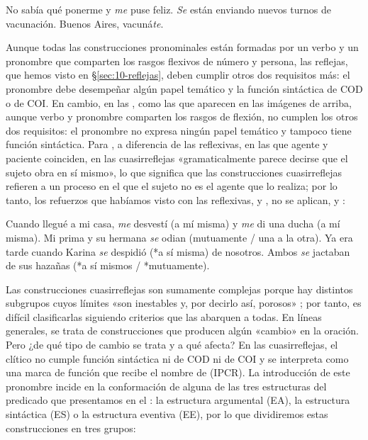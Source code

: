 
\begin{exe}
  \ex\label{ex:10-feliz} No sabía qué ponerme y \textit{me} puse feliz.
  \ex\label{ex:10-turnos} \textit{Se} están enviando nuevos turnos de vacunación.
  \ex\label{ex:10-vacunate} Buenos Aires, vacuná\textit{te}.
\end{exe}

Aunque todas las construcciones pronominales están formadas por un verbo y un
pronombre que comparten los rasgos flexivos de número y persona, las reflejas,
que hemos visto en §\ref{sec:10-reflejas}, deben cumplir otros dos requisitos
más: el pronombre debe desempeñar algún papel temático y la función sintáctica
de COD o de COI. En cambio, en las , como las que
aparecen en las imágenes de arriba, aunque verbo y pronombre comparten los rasgos
de flexión, no cumplen los otros dos requisitos: el pronombre no expresa ningún
papel temático y tampoco tiene función sintáctica. Para
\textcite[§\,759]{bello2002}, a diferencia de las reflexivas, en las que agente y
paciente coinciden, en las cuasirreflejas «gramaticalmente parece decirse que el
sujeto obra en sí mismo», lo que significa que las construcciones cuasirreflejas
refieren a un proceso en el que el sujeto no es el agente que lo realiza; por lo
tanto, los refuerzos que habíamos visto con las reflexivas,
 y , no se aplican,
 y :

\begin{exe}
  \ex\label{ex:10-desvesti} Cuando llegué a mi casa, \textit{me} desvestí (a mí
      misma) y \textit{me} di una ducha (a mí misma).
  \ex\label{ex:10-odian} Mi prima y su hermana \textit{se} odian (mutuamente /
      una a la otra).
  \ex\label{ex:10-despidio} Ya era tarde cuando Karina \textit{se} despidió (*a
      sí misma) de nosotros.
  \ex\label{ex:10-jactaban} Ambos \textit{se} jactaban de sus hazañas (*a sí
      mismos / *mutuamente).
\end{exe}

Las construcciones cuasirreflejas son sumamente complejas porque hay distintos
subgrupos cuyos límites «son inestables y, por decirlo así, porosos»
\parencite[17]{sanchezlopez2002}; por tanto, es difícil clasificarlas siguiendo
criterios que las abarquen a todas. En líneas generales, se trata de
construcciones que producen algún «cambio» en la oración. Pero ¿de qué tipo de
cambio se trata y a qué afecta? En las cuasirreflejas, el clítico no cumple
función sintáctica ni de COD ni de COI y se interpreta como una marca de función
que recibe el nombre de  (IPCR). La
introducción de este pronombre incide en la conformación de alguna de las tres
estructuras del predicado que presentamos en el : la estructura
argumental (EA), la estructura sintáctica (ES) o la estructura eventiva (EE), por
lo que dividiremos estas construcciones en tres grupos:

